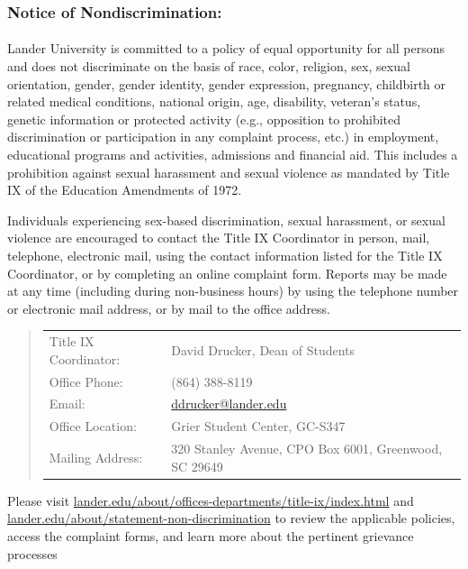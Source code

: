 \documentclass{article}
\begin{document}
    \begin{samepage}
      \subsubsection*{Notice of Nondiscrimination:}
      \paragraph*{}
  Lander University is committed to a policy of equal opportunity for all persons and does not discriminate on the basis of race, color, religion, sex, sexual orientation, gender, gender identity, gender expression, pregnancy, childbirth or related medical conditions, national origin, age, disability, veteran’s status, genetic information or protected activity (e.g., opposition to prohibited discrimination or participation in any complaint process, etc.) in employment, educational programs and activities, admissions and financial aid.
  This includes a prohibition against sexual harassment and sexual violence as mandated by Title IX of the Education Amendments of 1972.

    Individuals experiencing sex-based discrimination, sexual harassment, or sexual violence are encouraged to contact the Title IX Coordinator in person, mail, telephone, electronic mail, using the contact information listed for the Title IX Coordinator, or by completing an online complaint form.
  Reports may be made at any time (including during non-business hours) by using the telephone number or electronic mail address, or by mail to the office address.

\begin{quote}
  \begin{tabular}{@{}ll@{}}
    Title IX Coordinator: & David Drucker, Dean of Students\\
    Office Phone: & (864) 388-8119\\
    Email: & \href{mailto:ddrucker@lander.edu}{ddrucker@lander.edu}\\
    Office Location: & Grier Student Center, GC-S347\\
    Mailing Address: & 320 Stanley Avenue, CPO Box 6001, Greenwood, SC 29649
  \end{tabular}
\end{quote}

  Please visit \href{https://www.lander.edu/about/offices-departments/title-ix/index.html}{lander.edu/about/offices-departments/title-ix/index.html} and \href{https://www.lander.edu/about/statement-non-discrimination}{lander.edu/about/\allowbreak statement\allowbreak -non\allowbreak -discrimination} to review the applicable policies, access the complaint forms, and learn more about the pertinent grievance processes

    \mbox{}
    \end{samepage}
\end{document}
